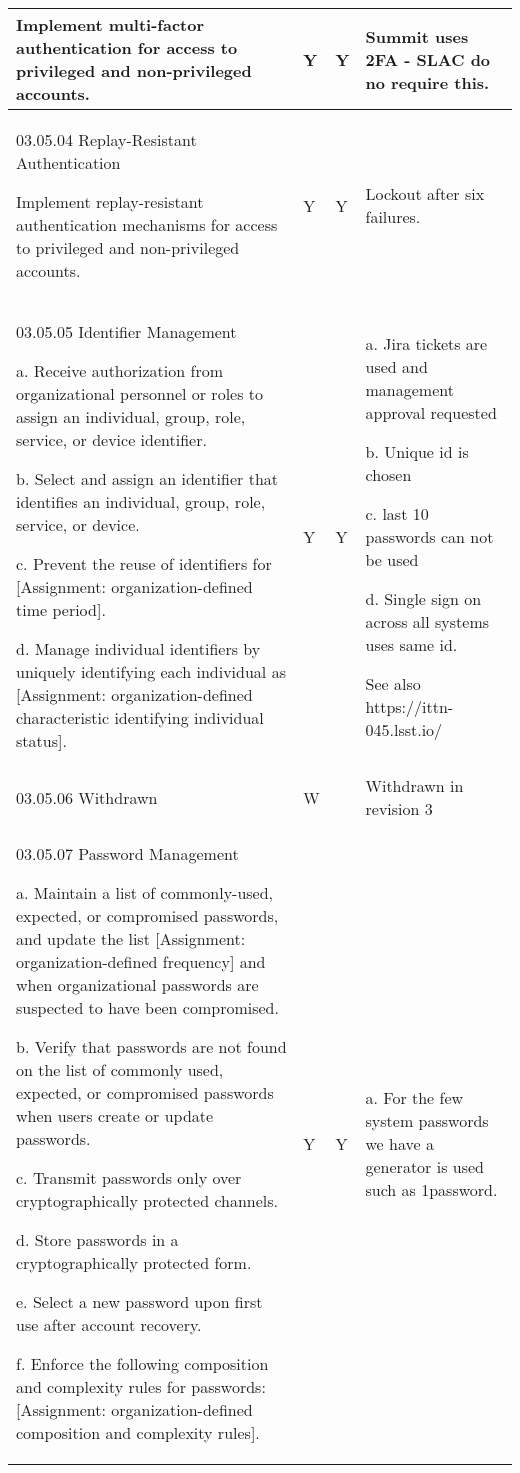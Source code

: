 \begin{longtable} {|p{}|p{}|p{}|p{} |}
{Implement multi-factor authentication for access to privileged and non-privileged accounts.}&{Y}&{Y}&{Summit uses 2FA - SLAC do no require this. } \\ \hline
{03.05.04 Replay-Resistant Authentication

Implement replay-resistant authentication mechanisms for access to privileged and non-privileged accounts.}&{Y}&{Y}&{Lockout after six failures.} \\ \hline
{03.05.05 Identifier Management

a. Receive authorization from organizational personnel or roles to assign an individual, group, role, service, or device identifier.

b. Select and assign an identifier that identifies an individual, group, role, service, or device.

c. Prevent the reuse of identifiers for [Assignment: organization-defined time period].

d. Manage individual identifiers by uniquely identifying each individual as [Assignment: organization-defined characteristic identifying individual status].}&{Y}&{Y}&{a. Jira tickets are used and management approval requested

b. Unique id is chosen

c. last 10 passwords can not be used

d. Single sign on across all systems uses same id.

See also https://ittn-045.lsst.io/} \\ \hline
{03.05.06 Withdrawn}&{W}&{}&{Withdrawn in revision 3} \\ \hline
{03.05.07 Password Management

a. Maintain a list of commonly-used, expected, or compromised passwords, and update the list [Assignment: organization-defined frequency] and when organizational passwords are suspected to have been compromised.

b. Verify that passwords are not found on the list of commonly used, expected, or compromised passwords when users create or update passwords.

c. Transmit passwords only over cryptographically protected channels.

d. Store passwords in a cryptographically protected form.

e. Select a new password upon first use after account recovery.

f. Enforce the following composition and complexity rules for passwords: [Assignment: organization-defined composition and complexity rules].}&{Y}&{Y}&{a. For the few system passwords we have  a generator is used such as 1password. 

}
\end{longtable}
